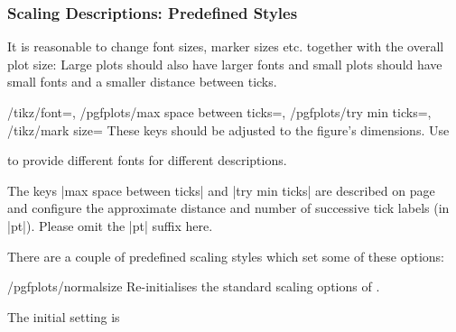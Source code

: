 \subsubsection{Scaling Descriptions: Predefined Styles}
\label{sec:scaling:styles}
It is reasonable to change font sizes, marker sizes etc. together with the overall plot size: Large plots should also have larger fonts and small plots should have small fonts and a smaller distance between ticks.

\begin{keylist}{
	/tikz/font=,
	/pgfplots/max space between ticks=,
	/pgfplots/try min ticks=,
	/tikz/mark size=}
	These keys should be adjusted to the figure's dimensions. Use 
\begin{codeexample}
\end{codeexample}
	to provide different fonts for different descriptions.

	The keys |max space between ticks| and |try min ticks| are described on page~\pageref{maxspacebetweenticks} and configure the approximate distance and number of successive tick labels (in |pt|). Please omit the |pt| suffix here.
\end{keylist}

There are a couple of predefined scaling styles which set some of these options:

\begin{stylekey}{/pgfplots/normalsize}
	Re-initialises the standard scaling options of \PGFPlots.

\begin{codeexample}[]
\end{codeexample}

	The initial setting is
\begin{codeexample}
\end{codeexample}
\end{stylekey}


